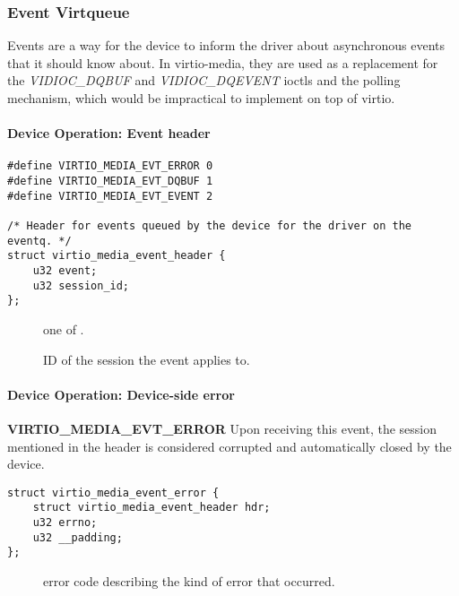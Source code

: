 \subsubsection{Event Virtqueue}

Events are a way for the device to inform the driver about asynchronous events
that it should know about. In virtio-media, they are used as a replacement for
the \textit{VIDIOC_DQBUF} and \textit{VIDIOC_DQEVENT} ioctls and the polling
mechanism, which would be impractical to implement on top of virtio.

\paragraph{Device Operation: Event header}

\begin{lstlisting}
#define VIRTIO_MEDIA_EVT_ERROR 0
#define VIRTIO_MEDIA_EVT_DQBUF 1
#define VIRTIO_MEDIA_EVT_EVENT 2

/* Header for events queued by the device for the driver on the eventq. */
struct virtio_media_event_header {
    u32 event;
    u32 session_id;
};
\end{lstlisting}

\begin{description}
\item[] one of .
\item[] ID of the session the event applies to.
\end{description}

\paragraph{Device Operation: Device-side error}

\textbf{VIRTIO_MEDIA_EVT_ERROR} Upon receiving this event, the session
mentioned in the header is considered corrupted and automatically closed by
the device.

\begin{lstlisting}
struct virtio_media_event_error {
    struct virtio_media_event_header hdr;
    u32 errno;
    u32 __padding;
};
\end{lstlisting}

\begin{description}
\item[] error code describing the kind of error that occurred.
\end{description}

